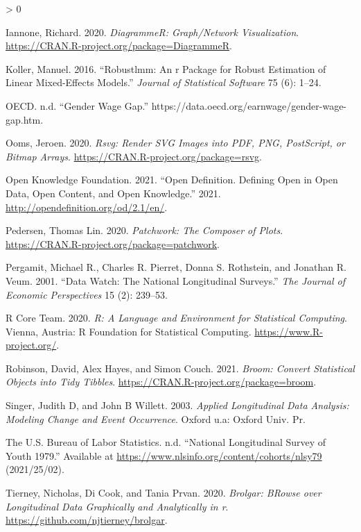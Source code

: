 \documentclass{article}
\newlength{\cslhangindent}
\newenvironment{CSLReferences}[2] %
 {%
  \setlength{\parindent}{0pt}
  \ifodd #1 \everypar{\setlength{\hangindent}{\cslhangindent}}\ignorespaces\fi
  \ifnum #2 > 0
  \setlength{\parskip}{#2\baselineskip}
  \fi
 }%
 {}
\begin{document}
\begin{CSLReferences}{1}{0}
\leavevmode\hypertarget{ref-DiagrammeR}{}%
Iannone, Richard. 2020. \emph{DiagrammeR: Graph/Network Visualization}. \url{https://CRAN.R-project.org/package=DiagrammeR}.

\leavevmode\hypertarget{ref-KollerManuel2016rARP}{}%
Koller, Manuel. 2016. {``Robustlmm: An r Package for Robust Estimation of Linear Mixed-Effects Models.''} \emph{Journal of Statistical Software} 75 (6): 1--24.

\leavevmode\hypertarget{ref-OECD}{}%
OECD. n.d. {``Gender Wage Gap.''} https://data.oecd.org/earnwage/gender-wage-gap.htm.

\leavevmode\hypertarget{ref-rsvg}{}%
Ooms, Jeroen. 2020. \emph{Rsvg: Render SVG Images into PDF, PNG, PostScript, or Bitmap Arrays}. \url{https://CRAN.R-project.org/package=rsvg}.

\leavevmode\hypertarget{ref-opendata}{}%
Open Knowledge Foundation. 2021. {``Open Definition. Defining Open in Open Data, Open Content, and Open Knowledge.''} 2021. \url{http://opendefinition.org/od/2.1/en/}.

\leavevmode\hypertarget{ref-patchwork}{}%
Pedersen, Thomas Lin. 2020. \emph{Patchwork: The Composer of Plots}. \url{https://CRAN.R-project.org/package=patchwork}.

\leavevmode\hypertarget{ref-MichaelRPergamit2001DWTN}{}%
Pergamit, Michael R., Charles R. Pierret, Donna S. Rothstein, and Jonathan R. Veum. 2001. {``Data Watch: The National Longitudinal Surveys.''} \emph{The Journal of Economic Perspectives} 15 (2): 239--53.

\leavevmode\hypertarget{ref-R}{}%
R Core Team. 2020. \emph{R: A Language and Environment for Statistical Computing}. Vienna, Austria: R Foundation for Statistical Computing. \url{https://www.R-project.org/}.

\leavevmode\hypertarget{ref-broom}{}%
Robinson, David, Alex Hayes, and Simon Couch. 2021. \emph{Broom: Convert Statistical Objects into Tidy Tibbles}. \url{https://CRAN.R-project.org/package=broom}.

\leavevmode\hypertarget{ref-SingerJudithD2003Alda}{}%
Singer, Judith D, and John B Willett. 2003. \emph{Applied Longitudinal Data Analysis: Modeling Change and Event Occurrence}. Oxford u.a: Oxford Univ. Pr.

\leavevmode\hypertarget{ref-nlsy79}{}%
The U.S. Bureau of Labor Statistics. n.d. {``National Longitudinal Survey of Youth 1979.''} Available at \url{https://www.nlsinfo.org/content/cohorts/nlsy79} (2021/25/02).

\leavevmode\hypertarget{ref-brolgar}{}%
Tierney, Nicholas, Di Cook, and Tania Prvan. 2020. \emph{Brolgar: BRowse over Longitudinal Data Graphically and Analytically in r}. \url{https://github.com/njtierney/brolgar}.


\end{CSLReferences}
\end{document}
